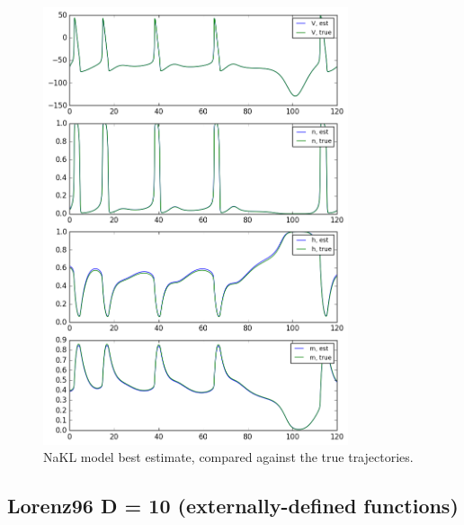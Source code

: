 \documentclass[11pt]{article}
\begin{document}
{\begin{figure}[h]
\centering
\includegraphics[width=0.8\textwidth]{figure/NaKL/estimation.png}
\caption{NaKL model best estimate, compared against the true trajectories.}
\label{fig:NaKL}
\end{figure}



\clearpage




\subsection{Lorenz96 D = 10 (externally-defined functions)}


}
\end{document}
